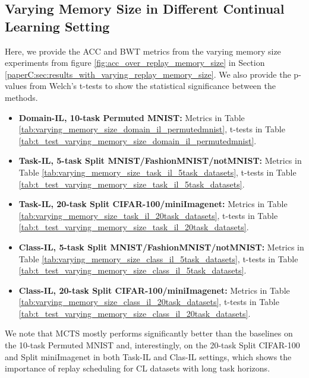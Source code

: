 \subsection{Varying Memory Size in Different Continual Learning Setting}
\label{paperC:app:varying_memory_size}

Here, we provide the ACC and BWT metrics from the varying memory size experiments from figure \ref{fig:acc_over_replay_memory_size} in Section \ref{paperC:sec:results_with_varying_replay_memory_size}. We also provide the p-values from Welch's t-tests to show the statistical significance between the methods. 
\begin{itemize}[topsep=0pt, noitemsep]
	\item \textbf{Domain-IL, 10-task Permuted MNIST:} Metrics in Table \ref{tab:varying_memory_size_domain_il_permutedmnist}, t-tests in Table \ref{tab:t_test_varying_memory_size_domain_il_permutedmnist}.
	
	\item \textbf{Task-IL, 5-task Split MNIST/FashionMNIST/notMNIST:} Metrics in Table \ref{tab:varying_memory_size_task_il_5task_datasets}, t-tests in Table \ref{tab:t_test_varying_memory_size_task_il_5task_datasets}. 
	
	\item \textbf{Task-IL, 20-task Split CIFAR-100/miniImagenet:} Metrics in Table \ref{tab:varying_memory_size_task_il_20task_datasets}, t-tests in Table \ref{tab:t_test_varying_memory_size_task_il_20task_datasets}. 
	
	\item \textbf{Class-IL, 5-task Split MNIST/FashionMNIST/notMNIST:} Metrics in Table \ref{tab:varying_memory_size_class_il_5task_datasets}, t-tests in Table \ref{tab:t_test_varying_memory_size_class_il_5task_datasets}. 
	
	\item \textbf{Class-IL, 20-task Split CIFAR-100/miniImagenet:} Metrics in Table \ref{tab:varying_memory_size_class_il_20task_datasets}, t-tests in Table \ref{tab:t_test_varying_memory_size_class_il_20task_datasets}. 
\end{itemize}
We note that MCTS mostly performs significantly better than the baselines on the 10-task Permuted MNIST and, interestingly, on the 20-task Split CIFAR-100 and Split miniImagenet in both Task-IL and Clas-IL settings, which shows the importance of replay scheduling for CL datasets with long task horizons.    

